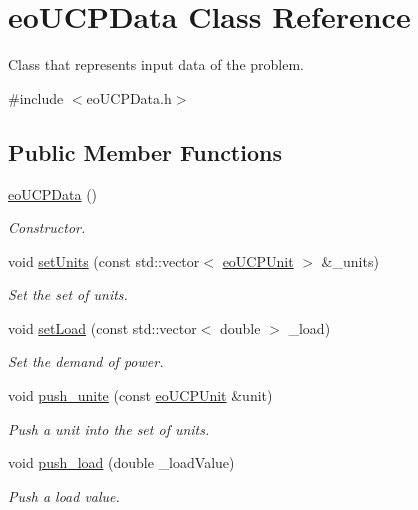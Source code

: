 \hypertarget{classeo_u_c_p_data}{\section{eo\-U\-C\-P\-Data \-Class \-Reference}
\label{classeo_u_c_p_data}
}


\-Class that represents input data of the problem.  




{\ttfamily \#include $<$eo\-U\-C\-P\-Data.\-h$>$}

\subsection*{\-Public \-Member \-Functions}
\begin{DoxyCompactItemize}
\item 
\hyperlink{classeo_u_c_p_data_a291f4cd392e5037c00de463af512c730}{eo\-U\-C\-P\-Data} ()
\begin{DoxyCompactList}\small\item\em \-Constructor. \end{DoxyCompactList}\item 
void \hyperlink{classeo_u_c_p_data_a3f0c271425184da74d4e2484b02ded81}{set\-Units} (const std\-::vector$<$ \hyperlink{classeo_u_c_p_unit}{eo\-U\-C\-P\-Unit} $>$ \&\-\_\-units)
\begin{DoxyCompactList}\small\item\em \-Set the set of units. \end{DoxyCompactList}\item 
void \hyperlink{classeo_u_c_p_data_a1665395716fbb7ccf06c5cab154e3d66}{set\-Load} (const std\-::vector$<$ double $>$ \-\_\-load)
\begin{DoxyCompactList}\small\item\em \-Set the demand of power. \end{DoxyCompactList}\item 
void \hyperlink{classeo_u_c_p_data_af8729ce76f4870676086c72bc012d91b}{push\-\_\-unite} (const \hyperlink{classeo_u_c_p_unit}{eo\-U\-C\-P\-Unit} \&unit)
\begin{DoxyCompactList}\small\item\em \-Push a unit into the set of units. \end{DoxyCompactList}\item 
void \hyperlink{classeo_u_c_p_data_a89ddf4c39a8e77e0127525dcbe546625}{push\-\_\-load} (double \-\_\-load\-Value)
\begin{DoxyCompactList}\small\item\em \-Push a load value. \end{DoxyCompactList}\item 

\end{DoxyCompactItemize}

